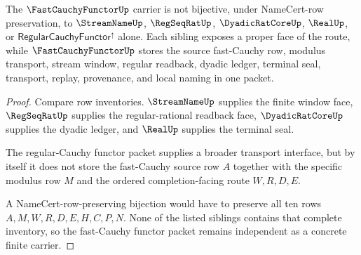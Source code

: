 \begin{theorem}
\label{thm:fast-cauchy-functor-sibling-independence}
The $\FastCauchyFunctorUp$ carrier is not bijective, under NameCert-row preservation, to $\StreamNameUp$, $\RegSeqRatUp$, $\DyadicRatCoreUp$, $\RealUp$, or $\mathsf{RegularCauchyFunctor}^{\uparrow}$ alone. Each sibling exposes a proper face of the route, while $\FastCauchyFunctorUp$ stores the source fast-Cauchy row, modulus transport, stream window, regular readback, dyadic ledger, terminal seal, transport, replay, provenance, and local naming in one packet.
\end{theorem}
\begin{proof}
Compare row inventories. $\StreamNameUp$ supplies the finite window face, $\RegSeqRatUp$ supplies the regular-rational readback face, $\DyadicRatCoreUp$ supplies the dyadic ledger, and $\RealUp$ supplies the terminal seal.

The regular-Cauchy functor packet supplies a broader transport interface, but by itself it does not store the fast-Cauchy source row $A$ together with the specific modulus row $M$ and the ordered completion-facing route $W,R,D,E$.

A NameCert-row-preserving bijection would have to preserve all ten rows $A,M,W,R,D,E,H,C,P,N$. None of the listed siblings contains that complete inventory, so the fast-Cauchy functor packet remains independent as a concrete finite carrier.
\end{proof}




